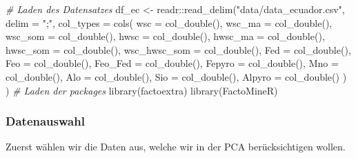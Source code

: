\documentclass[
]{article}
\newenvironment{Shaded}{\begin{snugshade}}{\end{snugshade}}
\newcommand{\AttributeTok}[1]{\textcolor[rgb]{0.77,0.63,0.00}{#1}}
\newcommand{\CommentTok}[1]{\textcolor[rgb]{0.56,0.35,0.01}{\textit{#1}}}
\newcommand{\FunctionTok}[1]{\textcolor[rgb]{0.00,0.00,0.00}{#1}}
\newcommand{\NormalTok}[1]{#1}
\newcommand{\OtherTok}[1]{\textcolor[rgb]{0.56,0.35,0.01}{#1}}
\newcommand{\SpecialCharTok}[1]{\textcolor[rgb]{0.00,0.00,0.00}{#1}}
\newcommand{\StringTok}[1]{\textcolor[rgb]{0.31,0.60,0.02}{#1}}
\begin{document}
\begin{Shaded}
\begin{Highlighting}[]
\CommentTok{\# Laden des Datensatzes }
\NormalTok{df\_ec }\OtherTok{\textless{}{-}}\NormalTok{ readr}\SpecialCharTok{::}\FunctionTok{read\_delim}\NormalTok{(}\StringTok{"data/data\_ecuador.csv"}\NormalTok{, }\AttributeTok{delim =} \StringTok{";"}\NormalTok{, }\AttributeTok{col\_types =} 
                          \FunctionTok{cols}\NormalTok{(}
                            \AttributeTok{wsc =} \FunctionTok{col\_double}\NormalTok{(),}
                            \AttributeTok{wsc\_ma =} \FunctionTok{col\_double}\NormalTok{(),}
                            \AttributeTok{wsc\_som =} \FunctionTok{col\_double}\NormalTok{(),}
                            \AttributeTok{hwsc =} \FunctionTok{col\_double}\NormalTok{(),}
                            \AttributeTok{hwsc\_ma =} \FunctionTok{col\_double}\NormalTok{(),}
                            \AttributeTok{hwsc\_som =} \FunctionTok{col\_double}\NormalTok{(),}
                            \AttributeTok{wsc\_hwsc\_som =} \FunctionTok{col\_double}\NormalTok{(),}
                            \AttributeTok{Fed =} \FunctionTok{col\_double}\NormalTok{(),}
                            \AttributeTok{Feo =} \FunctionTok{col\_double}\NormalTok{(),}
                            \AttributeTok{Feo\_Fed =} \FunctionTok{col\_double}\NormalTok{(),}
                            \AttributeTok{Fepyro =} \FunctionTok{col\_double}\NormalTok{(),}
                            \AttributeTok{Mno =} \FunctionTok{col\_double}\NormalTok{(),}
                            \AttributeTok{Alo =} \FunctionTok{col\_double}\NormalTok{(),}
                            \AttributeTok{Sio =} \FunctionTok{col\_double}\NormalTok{(),}
                            \AttributeTok{Alpyro =} \FunctionTok{col\_double}\NormalTok{()}
\NormalTok{                          )}
\NormalTok{                        )}
\CommentTok{\# Laden der packages}
\FunctionTok{library}\NormalTok{(factoextra)}
\FunctionTok{library}\NormalTok{(FactoMineR)}
\end{Highlighting}
\end{Shaded}

\hypertarget{datenauswahl}{%
\subsubsection{Datenauswahl}\label{datenauswahl}}

Zuerst wählen wir die Daten aus, welche wir in der PCA berücksichtigen wollen.
\end{document}
